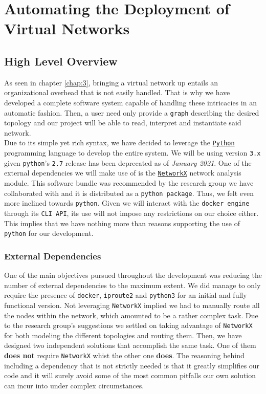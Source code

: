 \chapter{Automating the Deployment of Virtual Networks} \label{chap:4}
    \section{High Level Overview}
        As seen in chapter \ref{chap:3}, bringing a virtual network up entails an organizational overhead that is not easily handled. That is why we have developed a complete software system capable of handling these intricacies in an automatic fashion. Then, a user need only provide a \texttt{graph} describing the desired topology and our project will be able to read, interpret and instantiate said network.\\

        Due to its simple yet rich syntax, we have decided to leverage the \href{https://www.python.org}{\texttt{Python}} programming language to develop the entire system. We will be using version \texttt{3.x} given \texttt{python}'s \texttt{2.7} release has been deprecated as of \textit{January 2021}. One of the external dependencies we will make use of is the \href{https://networkx.org}{\texttt{NetworkX}} network analysis module. This software bundle was recommended by the research group we have collaborated with and it is distributed as a \texttt{python package}. Thus, we felt even more inclined towards \texttt{python}. Given we will interact with the \texttt{docker engine} through its \texttt{CLI API}, its use will not impose any restrictions on our choice either. This implies that we have nothing more than reasons supporting the use of \texttt{python} for our development.\\

        \subsection{External Dependencies}
            One of the main objectives pursued throughout the development was reducing the number of external dependencies to the maximum extent. We did manage to only require the presence of \texttt{docker}, \texttt{iproute2} and \texttt{python3} for an initial and fully functional version. Not leveraging \texttt{NetworkX} implied we had to manually route all the nodes within the network, which amounted to be a rather complex task. Due to the research group's suggestions we settled on taking advantage of \texttt{NetworkX} for both modeling the different topologies and routing them. Then, we have designed two independent solutions that accomplish the same task. One of them \textbf{does not} require \texttt{NetworkX} whist the other one \textbf{does}. The reasoning behind including a dependency that is not strictly needed is that it greatly simplifies our code and it will surely avoid some of the most common pitfalls our own solution can incur into under complex circumstances.\\


